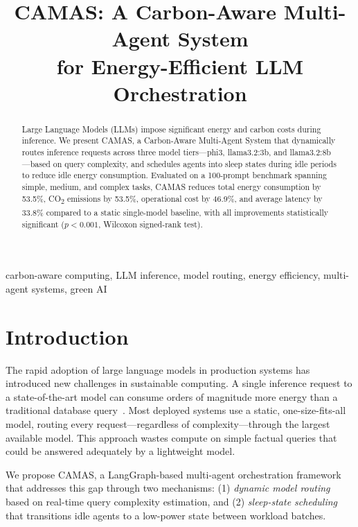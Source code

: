 \documentclass[conference]{IEEEtran}
\title{CAMAS: A Carbon-Aware Multi-Agent System\\
for Energy-Efficient LLM Orchestration}
\author{
  \IEEEauthorblockN{Praveen Raj}
  \IEEEauthorblockA{
    \textit{[Department / Institution]}\\
    [City, Country]\\
    [email@institution.edu]
  }
}
\begin{document}
\maketitle

\begin{abstract}
Large Language Models (LLMs) impose significant energy and carbon costs during
inference. We present CAMAS, a Carbon-Aware Multi-Agent System that dynamically
routes inference requests across three model tiers—phi3, llama3.2:3b, and
llama3.2:8b—based on query complexity, and schedules agents into sleep states
during idle periods to reduce idle energy consumption. Evaluated on a 100-prompt
benchmark spanning simple, medium, and complex tasks, CAMAS reduces total energy
consumption by 53.5\%, CO\textsubscript{2} emissions by 53.5\%, operational
cost by 46.9\%, and average latency by 33.8\% compared to a static single-model
baseline, with all improvements statistically significant ($p < 0.001$,
Wilcoxon signed-rank test).
\end{abstract}

\begin{IEEEkeywords}
carbon-aware computing, LLM inference, model routing, energy efficiency,
multi-agent systems, green AI
\end{IEEEkeywords}

\section{Introduction}

The rapid adoption of large language models in production systems has introduced
new challenges in sustainable computing. A single inference request to a
state-of-the-art model can consume orders of magnitude more energy than a
traditional database query~\cite{strubell2019energy}. Most deployed systems use
a static, one-size-fits-all model, routing every request—regardless of
complexity—through the largest available model. This approach wastes compute
on simple factual queries that could be answered adequately by a lightweight
model.

We propose CAMAS, a LangGraph-based multi-agent orchestration framework that
addresses this gap through two mechanisms: (1) \emph{dynamic model routing}
based on real-time query complexity estimation, and (2) \emph{sleep-state
scheduling} that transitions idle agents to a low-power state between workload
batches.
\end{document}
